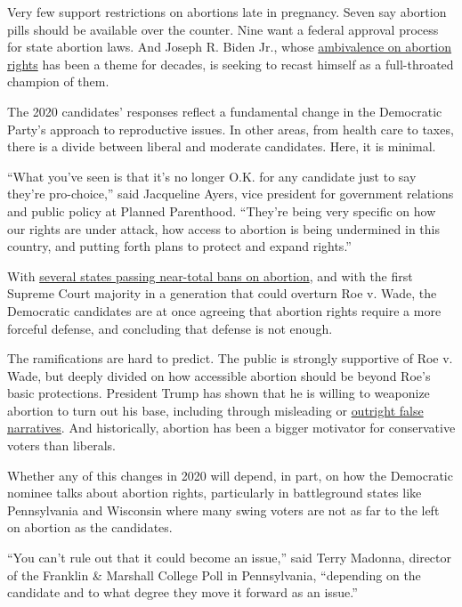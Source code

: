 Very few support restrictions on abortions late in pregnancy. Seven say
abortion pills should be available over the counter. Nine want a federal
approval process for state abortion laws. And Joseph R. Biden Jr., whose
\href{https://www.nytimes3xbfgragh.onion/2019/03/29/us/politics/biden-abortion-rights.html}{ambivalence
on abortion rights} has been a theme for decades, is seeking to recast
himself as a full-throated champion of them.

The 2020 candidates' responses reflect a fundamental change in the
Democratic Party's approach to reproductive issues. In other areas, from
health care to taxes, there is a divide between liberal and moderate
candidates. Here, it is minimal.

``What you've seen is that it's no longer O.K. for any candidate just to
say they're pro-choice,'' said Jacqueline Ayers, vice president for
government relations and public policy at Planned Parenthood. ``They're
being very specific on how our rights are under attack, how access to
abortion is being undermined in this country, and putting forth plans to
protect and expand rights.''

With
\href{https://www.nytimes3xbfgragh.onion/interactive/2019/us/abortion-laws-states.html}{several
states passing near-total bans on abortion}, and with the first Supreme
Court majority in a generation that could overturn Roe v. Wade, the
Democratic candidates are at once agreeing that abortion rights require
a more forceful defense, and concluding that defense is not enough.

The ramifications are hard to predict. The public is strongly supportive
of Roe v. Wade, but deeply divided on how accessible abortion should be
beyond Roe's basic protections. President Trump has shown that he is
willing to weaponize abortion to turn out his base, including through
misleading or
\href{https://www.nytimes3xbfgragh.onion/2019/02/26/health/abortion-bill-trump.html}{outright
false narratives}. And historically, abortion has been a bigger
motivator for conservative voters than liberals.

Whether any of this changes in 2020 will depend, in part, on how the
Democratic nominee talks about abortion rights, particularly in
battleground states like Pennsylvania and Wisconsin where many swing
voters are not as far to the left on abortion as the candidates.

``You can't rule out that it could become an issue,'' said Terry
Madonna, director of the Franklin \& Marshall College Poll in
Pennsylvania, ``depending on the candidate and to what degree they move
it forward as an issue.''

